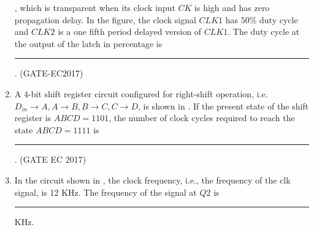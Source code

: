 \begin{enumerate}[label=\arabic*.,ref=\theenumi]
	,
		which is transparent when its clock input $CK$ is high and has zero propagation delay. In the figure, the clock signal $CLK1$ has $50\%$ duty cycle and $CLK2$ is a one fifth period delayed version of $CLK1$. The duty cycle at the output of the latch in percentage is \rule{1cm}{1pt}.
  \hfill(GATE-EC2017)
	\begin{figure}[H]
    \centering
    \resizebox{0.75\columnwidth}{!}{%
			      
	}
    \caption{}
	\label{fig:GATE-EC2017}
\end{figure}
\item A $4$-bit shift register circuit configured for right-shift operation, i.e.\\ $D_{in} \rightarrow A, A \rightarrow B, B \rightarrow C, C \rightarrow D$, is shown
	in .
 If the present state of the shift register is $ABCD = 1101$, the number of clock cycles required to reach the state $ABCD = 1111$ is
\rule{1cm}{0.1pt}.
\hfill (GATE EC 2017)
	\begin{figure}[H]
    \centering
    \resizebox{0.5\columnwidth}{!}{%
	
		}
 	\caption{}
	\label{fig:GATE-EC-2017}
\end{figure}
%
\item In the circuit shown
	in ,
the clock frequency, i.e., the frequency of the clk signal, is 12 KHz. The frequency of the signal at $Q2$ is  \rule{1cm}{0.1pt} KHz.


\end{enumerate}
